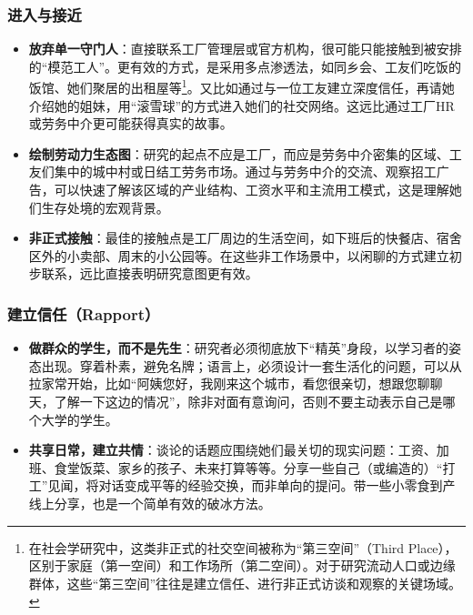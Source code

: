 \documentclass[UTF8]{ctexart}
\begin{document}
\subsubsection{进入与接近}
\begin{itemize}[label=\textbullet, leftmargin=*]
    \item \textbf{放弃单一守门人}：直接联系工厂管理层或官方机构，很可能只能接触到被安排的“模范工人”。更有效的方式，是采用多点渗透法，如同乡会、工友们吃饭的饭馆、她们聚居的出租屋等\footnote[1]{在社会学研究中，这类非正式的社交空间被称为“第三空间”（Third Place），区别于家庭（第一空间）和工作场所（第二空间）。对于研究流动人口或边缘群体，这些“第三空间”往往是建立信任、进行非正式访谈和观察的关键场域。}。又比如通过与一位工友建立深度信任，再请她介绍她的姐妹，用“滚雪球”的方式进入她们的社交网络。这远比通过工厂HR或劳务中介更可能获得真实的故事。
    \item \textbf{绘制劳动力生态图}：研究的起点不应是工厂，而应是劳务中介密集的区域、工友们集中的城中村或日结工劳务市场。通过与劳务中介的交流、观察招工广告，可以快速了解该区域的产业结构、工资水平和主流用工模式，这是理解她们生存处境的宏观背景。
    \item \textbf{非正式接触}：最佳的接触点是工厂周边的生活空间，如下班后的快餐店、宿舍区外的小卖部、周末的小公园等。在这些非工作场景中，以闲聊的方式建立初步联系，远比直接表明研究意图更有效。
\end{itemize}

\subsubsection{建立信任（Rapport）}
\begin{itemize}[label=\textbullet, leftmargin=*]
    \item \textbf{做群众的学生，而不是先生}：研究者必须彻底放下“精英”身段，以学习者的姿态出现。穿着朴素，避免名牌；语言上，必须设计一套生活化的问题，可以从拉家常开始，比如“阿姨您好，我刚来这个城市，看您很亲切，想跟您聊聊天，了解一下这边的情况”，除非对面有意询问，否则不要主动表示自己是哪个大学的学生。
    \item \textbf{共享日常，建立共情}：谈论的话题应围绕她们最关切的现实问题：工资、加班、食堂饭菜、家乡的孩子、未来打算等等。分享一些自己（或编造的）“打工”见闻，将对话变成平等的经验交换，而非单向的提问。带一些小零食到产线上分享，也是一个简单有效的破冰方法。
\end{itemize}
\end{document}
